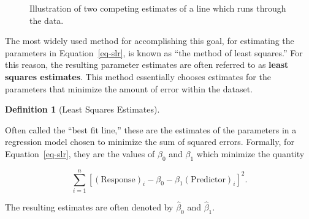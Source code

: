\documentclass[
  letterpaper,
  DIV=11,
  numbers=noendperiod]{scrreprt}
\theoremstyle{plain}
\theoremstyle{definition}
\theoremstyle{definition}
\newtheorem{definition}{Definition}[chapter]
\theoremstyle{remark}
\begin{document}
\begin{figure}


\caption{\label{fig-regmodel-least-squares}Illustration of two competing
estimates of a line which runs through the data.}

\end{figure}%

The most widely used method for accomplishing this goal, for estimating
the parameters in Equation~\ref{eq-slr}, is known as ``the method of
least squares.'' For this reason, the resulting parameter estimates are
often referred to as \textbf{least squares estimates}. This method
essentially chooses estimates for the parameters that minimize the
amount of error within the dataset.

\begin{definition}[Least Squares
Estimates]\protect\hypertarget{def-least-squares-estimates}{}\label{def-least-squares-estimates}

Often called the ``best fit line,'' these are the estimates of the
parameters in a regression model chosen to minimize the sum of squared
errors. Formally, for Equation~\ref{eq-slr}, they are the values of
\(\beta_0\) and \(\beta_1\) which minimize the quantity

\[\sum_{i=1}^n \left[(\text{Response})_i - \beta_0 - \beta_1(\text{Predictor})_{i}\right]^2.\]

The resulting estimates are often denoted by \(\widehat{\beta}_0\) and
\(\widehat{\beta}_1\).

\end{definition}
\end{document}
